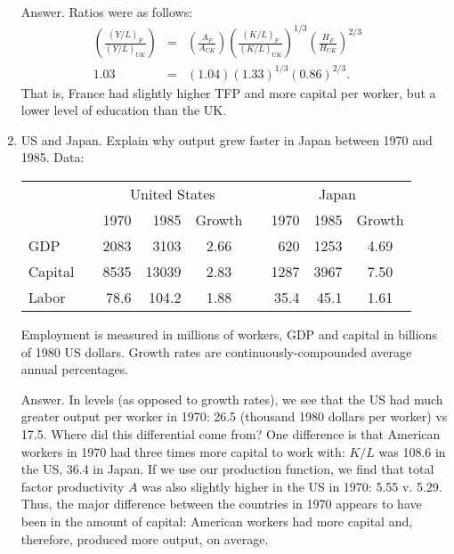 \begin{enumerate}
Answer.  Ratios were as follows:
\begin{eqnarray*}
    \left( \frac{(Y/L)_{F}}{(Y/L)_{UK}} \right) &=& \left( \frac{A_{F}}{A_{UK}} \right)
                        \left( \frac{(K/L)_{F}}{(K/L)_{UK}} \right)^{1/3}
                        \left( \frac{H_{F}}{H_{UK}} \right)^{2/3}  \\
            1.03              &=&   (1.04) (1.33)^{1/3} (0.86)^{2/3}  . \phantom{\sum^\infty}
\end{eqnarray*}
That is, France had slightly higher TFP and more capital per worker,
but a lower level of education than the UK.

\item US and Japan.
Explain why output grew faster in Japan between 1970 and 1985.
Data:
%
\begin{center}
\small
\begin{tabular*}{0.9\textwidth}{lcrrccrrc}
\toprule
&&  \multicolumn{3}{c}{United States} && \multicolumn{3}{c}{Japan}        \\
                        \cmidrule{3-5}  \cmidrule{7-9}
&&              1970  & 1985 & Growth && 1970 & 1985 & Growth \\
\midrule
GDP && 2083 &  3103  &  2.66    &  &   620  & 1253  &  4.69   \\
Capital      && 8535 & 13039  &  2.83    &  &  1287  & 3967  &  7.50   \\
Labor  && 78.6 & 104.2  &  1.88    &  &  35.4  & 45.1  &  1.61   \\
\bottomrule
\end{tabular*}
\end{center}
%
Employment is measured in millions of workers,
GDP and capital in
billions of 1980 US dollars.
Growth rates are continuously-compounded average annual percentages.

Answer.
In levels (as opposed to growth rates), we see that
the US had much greater output per worker in 1970:
26.5 (thousand 1980 dollars per worker) vs 17.5.
Where did this differential come from?  One difference is that American
workers in 1970 had three times more capital to work with:
$K/L$ was 108.6 in the US, 36.4 in Japan.  If we use our production
function, we find that total factor productivity $A$
was also slightly higher in the US in 1970:  5.55 v. 5.29.
Thus, the major difference between the countries in
1970 appears to have been in the amount of capital:  American workers had more
capital and, therefore, produced more output, on average.


\end{enumerate}

